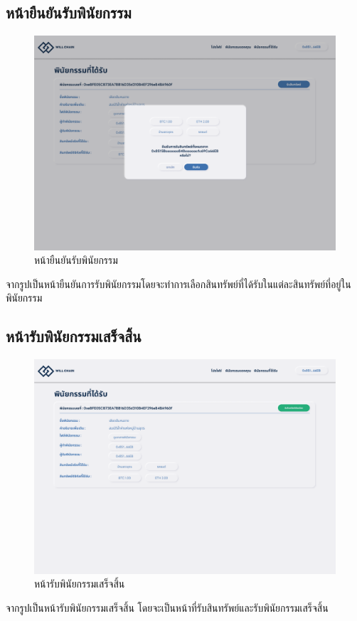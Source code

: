 \documentclass[12pt,oneside,openright,a4paper]{cpe-thai-project}
\begin{document}
\subsection{หน้ายืนยันรับพินัยกรรม}
		\begin{figure}[!thb]
			\centering
			\includegraphics[scale=0.2]{claimWillConfirm}
			\caption{หน้ายืนยันรับพินัยกรรม}
		\end{figure}
		\FloatBarrier
		\tab จากรูปเป็นหน้ายืนยันการรับพินัยกรรมโดยจะทำการเลือกสินทรัพย์ที่ได้รับในแต่ละสินทรัพย์ที่อยู่ในพินัยกรรม
\subsection{หน้ารับพินัยกรรมเสร็จสิ้น}
		\begin{figure}[!thb]
			\centering
			\includegraphics[scale=0.2]{claimWillSuccess}
			\caption{หน้ารับพินัยกรรมเสร็จสิ้น}
		\end{figure}
		\FloatBarrier
		\tab จากรูปเป็นหน้ารับพินัยกรรมเสร็จสิ้น โดยจะเป็นหน้าที่รับสินทรัพย์และรับพินัยกรรมเสร็จสิ้น
\end{document}
